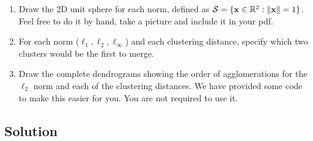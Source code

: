 \documentclass[submit]{harvardml}
\begin{document}
\begin{problem}
  \begin{enumerate}
  \item Draw the 2D unit sphere for each norm,
  defined as $\mathcal{S} = \{\mathbf{x} \in \mathbb{R}^2: \|\mathbf{x}\| = 1 \}$. Feel free to do
  it by hand, take a picture and include it in your pdf.
\item  For each norm ($\ell_1, \ell_2, \ell_\infty$) and each clustering distance, specify which two clusters would
  be the first to merge.
\item Draw the complete dendrograms showing the order of agglomerations for the $\ell_2$ norm and each of the clustering distances. We have provided some code to make this easier for you. You are not required to use it.
  \end{enumerate}


\end{problem}

\subsection*{Solution}
\end{document}
